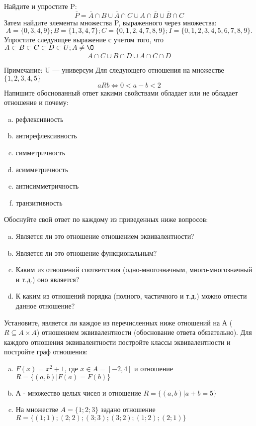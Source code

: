 \documentclass[10pt]{exam}
\begin{document}
\begin{questions}
\question
Найдите и упростите P:
\begin{equation*}
\overline{P} = \overline{A} \cap B \cup \overline{A} \cap C \cup A \cap \overline{B} \cup \overline{B} \cap C
\end{equation*}
Затем найдите элементы множества P, выраженного через множества:
\begin{equation*}
A = \{0, 3, 4, 9\}; 
B = \{1, 3, 4, 7\};
C = \{0, 1, 2, 4, 7, 8, 9\};
I = \{0, 1, 2, 3, 4, 5, 6, 7, 8, 9\}.
\end{equation*}\question
Упростите следующее выражение с учетом того, что $A\subset B \subset C \subset D \subset U; A \neq \O$
\begin{equation*}
A \cap  \overline{C} \cup B \cap \overline{D} \cup  \overline{A} \cap C \cap  \overline{D}
\end{equation*}

Примечание: U — универсум\question
Для следующего отношения на множестве $\{1, 2, 3, 4, 5\}$ 
\begin{equation*}
aRb \iff 0 < a-b<2
\end{equation*}
Напишите обоснованный ответ какими свойствами обладает или не обладает отношение и почему:   
\begin{enumerate} [a)]\setcounter{enumi}{0}
\item рефлексивность
\item антирефлексивность
\item симметричность
\item асимметричность
\item антисимметричность
\item транзитивность
\end{enumerate}

Обоснуйте свой ответ по каждому из приведенных ниже вопросов:
\begin{enumerate} [a)]\setcounter{enumi}{0}
    \item Является ли это отношение отношением эквивалентности?
    \item Является ли это отношение функциональным?
    \item Каким из отношений соответствия (одно-многозначным, много-многозначный и т.д.) оно является?
    \item К каким из отношений порядка (полного, частичного и т.д.) можно отнести данное отношение?
\end{enumerate}
\question
Установите, является ли каждое из перечисленных ниже отношений на А ($R \subseteq A \times A$) отношением эквивалентности (обоснование ответа обязательно). Для каждого отношения эквивалентности постройте классы эквивалентности и постройте граф отношения:
\begin{enumerate} [a)]\setcounter{enumi}{0}
\item $F(x)=x^{2}+1$, где $x \in A = [-2, 4]$ и отношение $R = \{(a,b)|F(a) = F(b)\}$
\item А - множество целых чисел и отношение $R = \{(a,b)|a + b = 5\}$
\item На множестве $A = \{1; 2; 3\}$ задано отношение $R = \{(1; 1); (2; 2); (3; 3); (3; 2); (1; 2); (2; 1)\}$


\end{enumerate}
\end{questions}
\end{document}
